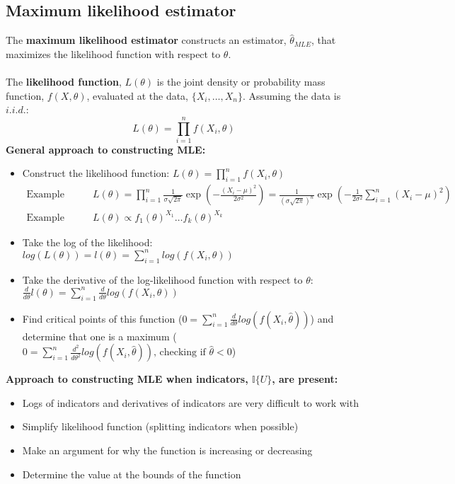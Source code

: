 \documentclass{article}
\begin{document}
\subsection{Maximum likelihood estimator}
The \textbf{maximum likelihood estimator} constructs an estimator, $\hat{\theta}_{MLE}$, that maximizes the likelihood function with respect to $\theta$. \\ \\
The \textbf{likelihood function}, $L(\theta)$ is the joint density or probability mass function, $f(X, \theta)$, evaluated at the data, $\{X_i, \dots, X_n\}$. Assuming the data is $i.i.d.$:
\begin{equation*}
    L(\theta) = \prod_{i=1}^nf(X_i, \theta)
\end{equation*}
\textbf{General approach to constructing MLE:}
\begin{itemize}
    \item Construct the likelihood function: $L(\theta) = \prod_{i=1}^nf(X_i, \theta)$
    \begin{align*}
        \textrm{Example normal: } &L(\theta) = \prod_{i=1}^n \frac{1}{\sigma \sqrt{2 \pi}} \exp \left (-\frac{(X_i - \mu)^2}{2 \sigma ^ 2}\right ) = \frac{1}{(\sigma \sqrt{2 \pi})^n} \exp \left( -\frac{1}{2 \sigma ^ 2} \sum_{i=1}^n (X_i - \mu)^2 \right)\\
        \textrm{Example restricted multinomial: } &L(\theta) \propto f_1(\theta)^{X_1}\dots f_k(\theta)^{X_k}
    \end{align*}
    \item Take the log of the likelihood: $log(L(\theta)) = l(\theta) = \sum_{i=1}^nlog(f(X_i, \theta))$
    \item Take the derivative of the log-likelihood function with respect to $\theta$: $\frac{d}{d\theta}l(\theta) = \sum_{i=1}^n\frac{d}{d\theta}log(f(X_i, \theta))$
    \item Find critical points of this function ($0 = \sum_{i=1}^n\frac{d}{d\theta}log(f(X_i, \hat{\theta}))$) and determine that one is a maximum ($0 = \sum_{i=1}^n\frac{d^2}{d\theta^2}log(f(X_i, \hat{\theta})) \textrm{, checking if } \hat{\theta} < 0$)
\end{itemize}
\textbf{Approach to constructing MLE when indicators, $\mathbb{I}\{U\}$, are present:}
\begin{itemize}
    \item Logs of indicators and derivatives of indicators are very difficult to work with
    \item Simplify likelihood function (splitting indicators when possible)
    \item Make an argument for why the function is increasing or decreasing
    \item Determine the value at the bounds of the function
\end{itemize}
\end{document}
